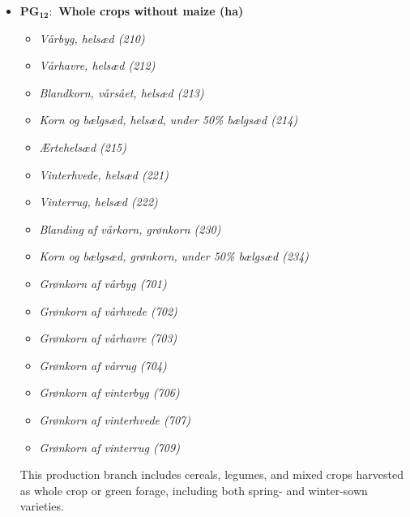 \documentclass[12pt]{article}
\begin{document}
\begin{itemize}
\begin{itemize}
        \item[$+$] \textit{Græs til udegrise, omdrift (270)}
        \item[$+$] \textit{Græs og kløvergræs uden norm, over 50 \% kløver (omdrift) (285)}
        \item[$+$] \textit{Markbræmme, på omdrift, slåning (327)}
        \item[$+$] \textit{Græs i omdrift, uden udbetaling af økologi-tilskud (306)}
    \end{itemize}
    \item[] \textbf{PG$_{\textbf{12}}:$ Whole crops without maize (ha)}
    \begin{itemize}
        \item[$+$] \textit{Vårbyg, helsæd (210)}
        \item[$+$] \textit{Vårhavre, helsæd (212)}
        \item[$+$] \textit{Blandkorn, vårsået, helsæd (213)}
        \item[$+$] \textit{Korn og bælgsæd, helsæd, under 50\% bælgsæd (214)}
        \item[$+$] \textit{Ærtehelsæd (215)}
        \item[$+$] \textit{Vinterhvede, helsæd (221)}
        \item[$+$] \textit{Vinterrug, helsæd (222)}
        \item[$+$] \textit{Blanding af vårkorn, grønkorn (230)}
        \item[$+$] \textit{Korn og bælgsæd, grønkorn, under 50\% bælgsæd (234)}
        \item[$+$] \textit{Grønkorn af vårbyg (701)}
        \item[$+$] \textit{Grønkorn af vårhvede (702)}
        \item[$+$] \textit{Grønkorn af vårhavre (703)}
        \item[$+$] \textit{Grønkorn af vårrug (704)} 
        \item[$+$] \textit{Grønkorn af vinterbyg (706)}
        \item[$+$] \textit{Grønkorn af vinterhvede (707)}
        \item[$+$] \textit{Grønkorn af vinterrug (709)}
    \end{itemize}
    This production branch includes cereals, legumes, and mixed crops harvested as whole crop or green forage, including both spring- and winter-sown varieties. 
    

\end{itemize}
\end{document}
